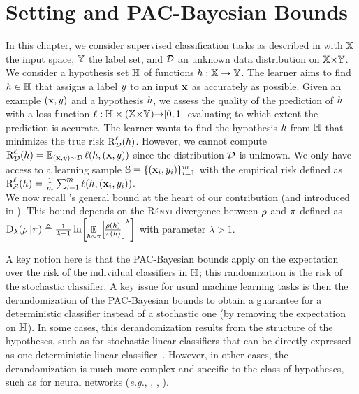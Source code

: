 \section{Setting and PAC-Bayesian Bounds}
\label{chap:dis-pra:sec:setting}

In this chapter, we consider supervised classification tasks as described in  with $\X$ the input space, $\Y$ the label set, and $\D$ an unknown data distribution on $\X{\times}\Y$.
We consider a hypothesis set $\H$ of functions $\h:\X \to \Y$.
The learner aims to find  $\h\in\H$ that assigns a label $\y$ to an input $\x$ as accurately as possible. 
Given an example $(\x, \y)$ and a hypothesis $\h$, we assess the quality of the prediction of $\h$ with a loss function $\loss: \H\times (\X{\times}\Y) {\to} [0, 1]$ evaluating to which extent the prediction is accurate.
The learner wants to find the hypothesis $\h$ from $\H$ that minimizes the true risk $\RiskLoss_{\D}(\h)$. 
However, we cannot compute $\RiskLoss_{\D}(\h)=\EE_{(\x,\y)\sim\D}\loss(\h, (\x,\y))$ since the distribution $\D$ is unknown.
We only have access to a learning sample $\S=\{(\x_i,\y_i)\}_{i=1}^{\m}$ with the empirical risk defined as $\RiskLoss_{\dS}(\h)=\frac{1}{\m}\sum_{i=1}^{\m}\loss(\h, (\x_i,\y_i))$.\\

We now recall \citet{BeginGermainLavioletteRoy2016}'s general bound at the heart of our contribution (and introduced in ).
This bound depends on the \textsc{Rényi} divergence between $\Q$ and $\P$ defined as $\Renyi_{\lambda}(\Q\|\P) \defeq \frac{1}{\lambda{-}1}\ln\!\LB \text{\small${\displaystyle \EE_{\h{\sim}\P}}$}\!\LB\!\frac{ \Q(\h)}{\P(\h)}\RB^{\!\lambda}\RB$ with parameter $\lambda>1$.

\generalbegin*

A key notion here is that the PAC-Bayesian bounds apply on the expectation over the risk of the individual classifiers in $\H$; this randomization is the risk of the stochastic classifier.
A key issue for usual machine learning tasks is then the derandomization of the PAC-Bayesian bounds to obtain a guarantee for a deterministic classifier instead of a stochastic one (by removing the expectation on $\H$).
In some cases, this derandomization results from the structure of the hypotheses, such as for stochastic linear classifiers that can be directly expressed as one deterministic linear classifier~\citep{GermainLacasseLavioletteMarchand2009}.
However, in other cases, the derandomization is much more complex and specific to the class of hypotheses, such as for neural networks ({\it e.g.}, \citet{NeyshaburBhojanapalliSrebro2018}, \citet[Ap. J]{NagarajanKolter2019b}, \citet{BiggsGuedj2022}).\\

